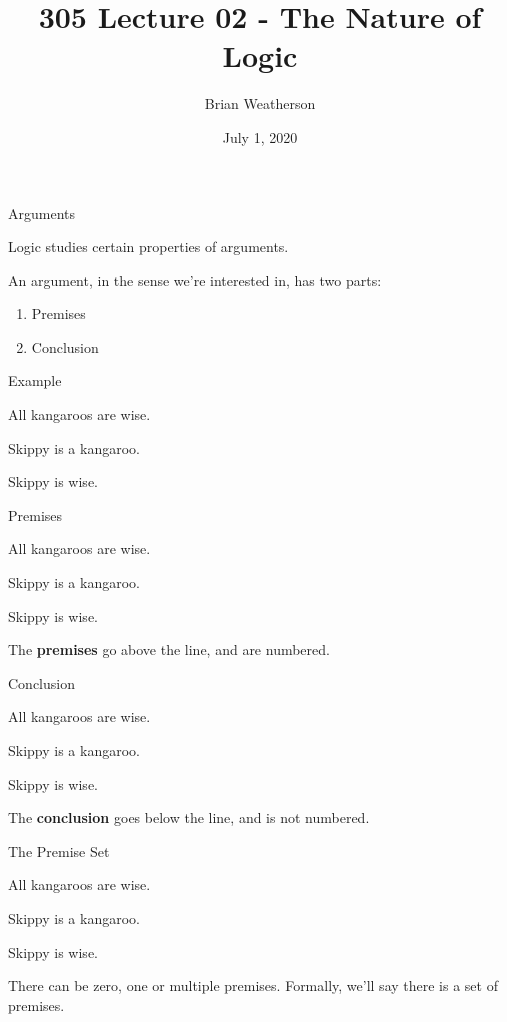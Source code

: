 \documentclass[ignorenonframetext,]{beamer}
\title{305 Lecture 02 - The Nature of Logic}
\author{Brian Weatherson}
\date{July 1, 2020}
\providecommand{\tightlist}{%
  \setlength{\itemsep}{0pt}\setlength{\parskip}{0pt}}
\renewcommand{\,}{\text{, }}
\renewenvironment*{quote}	
	{\list{}{\rightmargin   \leftmargin} \item } 	
	{\endlist }
\newcommand{\DisplayArg}[2]{
\begin{enumerate}
{#1}
\end{enumerate}
\vspace{-6pt}
\hrulefill

\begin{quote}
{\normalfont #2}
\end{quote}
\vspace{12pt}
}
\begin{document}
\frame{\titlepage}

\begin{frame}{Arguments}
\protect\hypertarget{arguments}{}

Logic studies certain properties of arguments.

An argument, in the sense we're interested in, has two parts:

\begin{enumerate}
\tightlist
\item
  Premises
\item
  Conclusion
\end{enumerate}

\end{frame}

\begin{frame}{Example}
\protect\hypertarget{example}{}

\DisplayArg{ \item All kangaroos are wise. \item Skippy is a kangaroo. } { Skippy is wise. }

\end{frame}

\begin{frame}{Premises}
\protect\hypertarget{premises}{}

\DisplayArg{ \item All kangaroos are wise. \item Skippy is a kangaroo. } { Skippy is wise. }

The \textbf{premises} go above the line, and are numbered.

\end{frame}

\begin{frame}{Conclusion}
\protect\hypertarget{conclusion}{}

\DisplayArg{ \item All kangaroos are wise. \item Skippy is a kangaroo. } { Skippy is wise. }

The \textbf{conclusion} goes below the line, and is not numbered.

\end{frame}

\begin{frame}{The Premise Set}
\protect\hypertarget{the-premise-set}{}

\DisplayArg{ \item All kangaroos are wise. \item Skippy is a kangaroo. } { Skippy is wise. }

There can be zero, one or multiple premises. Formally, we'll say there
is a set of premises.

\end{frame}
\end{document}
